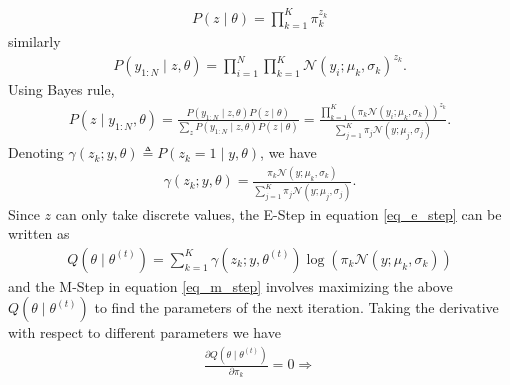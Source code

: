 \documentclass[10pt ]{article}
\begin{document}
\begin{align}
P(z \mid \theta) = \prod_{k=1}^K \pi_k^{z_k }
\end{align}
similarly
\begin{align}
P(y_{1:N} \mid z, \theta ) = \prod_{i=1}^N  \prod_{k=1}^K \mathcal{N}(y_{i} ; \mu_k, \sigma_k)^{z_k}.
\end{align}
Using Bayes rule, 
\begin{align}
P(z \mid y_{1:N}, \theta ) = \frac{P(y_{1:N} \mid z, \theta ) P(z \mid \theta)}{\sum_z P(y_{1:N} \mid z, \theta ) P(z \mid \theta)}  = \frac{\prod_{k=1}^K ( \pi_k\mathcal{N}(y_i ; \mu_k, \sigma_k))^{z_k }}{\sum_{j=1}^K \pi_j \mathcal{N}(y ; \mu_j, \sigma_j) }.
\end{align}
Denoting $\gamma(z_k; y, \theta) \triangleq P(z_k = 1\mid y, \theta ) $, we have
\begin{align}
\gamma(z_k; y, \theta )  =   \frac{  \pi_k\mathcal{N}(y ; \mu_k, \sigma_k) }{\sum_{j=1}^K \pi_j \mathcal{N}(y ; \mu_j, \sigma_j) }.
\end{align}
Since $z$ can only take discrete values, the E-Step in equation \eqref{eq_e_step} can be written as 
\begin{align}
Q(\theta \mid \theta^{(t)}) = \sum_{k=1}^K \gamma(z_k; y, \theta^{(t)} )  \log \left( \pi_k \mathcal{N}(y ; \mu_k, \sigma_k) \right)
\end{align}
and the M-Step in equation \eqref{eq_m_step} involves maximizing the above $Q(\theta \mid \theta^{(t)}) $ to find the parameters of the next iteration. Taking the derivative with respect to different parameters we have 
\begin{align}
\frac{\partial Q(\theta \mid \theta^{(t)})}{\partial \pi_k} = 0 \Rightarrow
\end{align}
\end{document}

